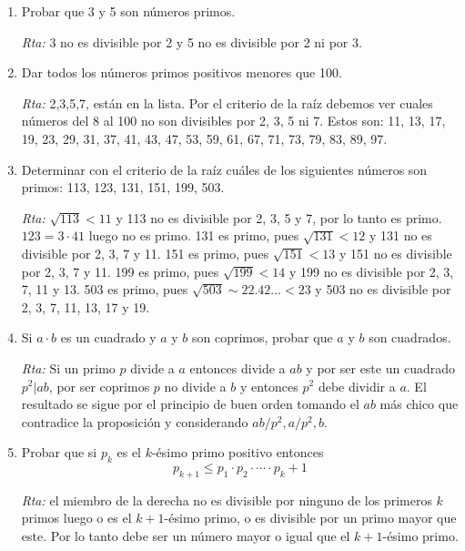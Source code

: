 \documentclass[12pt,spanish,makeidx]{amsbook}
\newcommand{\rta}{\noindent\textit{Rta: }}
\begin{document}
\begin{enumerate}
\begin{enumerate}
	 \rta  usar el inciso anterior con $d=(a,b)$.
\end{enumerate}

\smallskip

\item Probar que 3  y 5 son números primos.

 \rta  3 no es divisible por 2 y 5 no es divisible por 2 ni por 3.
\smallskip

\item  Dar todos los números primos positivos menores que 100.

\rta  2,3,5,7, están en la lista. Por  el criterio de la raíz debemos ver cuales números del  8 al 100 no son divisibles  por 2, 3, 5 ni 7. Estos son: 11, 13, 17, 19, 23, 29, 31, 37, 41, 43, 47, 53, 59, 61, 67, 71, 73, 79, 83, 89, 97.
 
\smallskip

\item Determinar con el criterio de la raíz cuáles de los siguientes números son primos: 113, 123, 131, 151, 199, 503.

 \rta  $\sqrt{113}< 11$ y 113 no es divisible por 2, 3, 5 y 7, por lo tanto es primo. $123=3\cdot 41$ luego no es primo. 131 es primo, pues $\sqrt{131}<12$ y 131 no es divisible por 2, 3, 7 y 11. 151 es primo, pues $\sqrt{151}<13$ y 151 no es divisible por 2, 3, 7 y 11. 199 es primo, pues $\sqrt{199}<14$ y 199 no es divisible por 2, 3, 7, 11 y 13. 503 es primo, pues $\sqrt{503} \sim 22.42...<23$ y 503 no es divisible por 2, 3, 7, 11, 13, 17 y 19.
 
\smallskip

\item Si $a\cdot b$ es un cuadrado y $a$ y $b$ son coprimos, probar que $a$ y $b$ son cuadrados.

\rta  Si un primo $p$ divide a $a$ entonces divide a $ab$ y por ser este un cuadrado $p^2\vert ab$, por ser coprimos $p$ no divide a $b$ y entonces $p^2$ debe dividir a $a$. El resultado se sigue por el principio de buen orden tomando el $ab$ más chico que contradice la proposición y considerando $ab/p^2, a/p^2, b$.


\smallskip
\item Probar que si $p_k$ es el $k$-\'esimo primo positivo entonces $$p_{k+1}\leq p_1\cdot p_2\cdot \cdots \cdot p_k+1$$

 \rta  el miembro de la derecha no es divisible por ninguno de los primeros $k$ primos luego o es el $k+1$-ésimo primo, o es divisible por un primo mayor que este. Por lo tanto debe ser un número mayor o igual que el $k+1$-ésimo primo.
 

\end{enumerate}
\end{document}
